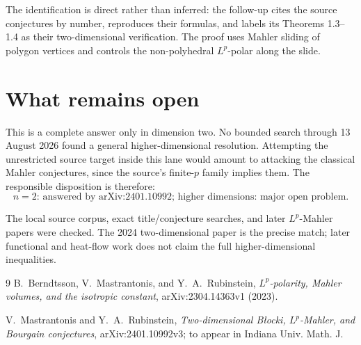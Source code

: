 \documentclass[11pt]{article}
\begin{document}
The identification is direct rather than inferred: the follow-up cites the
source conjectures by number, reproduces their formulas, and labels its
Theorems 1.3--1.4 as their two-dimensional verification.  The proof uses
Mahler sliding of polygon vertices and controls the non-polyhedral
$L^p$-polar along the slide.

\section{What remains open}

This is a complete answer only in dimension two.  No bounded search through
13 August 2026 found a general higher-dimensional resolution.  Attempting the
unrestricted source target inside this lane would amount to attacking the
classical Mahler conjectures, since the source's finite-$p$ family implies
them.  The responsible disposition is therefore:
\[
 \boxed{\text{$n=2$: answered by arXiv:2401.10992;
 higher dimensions: major open problem.}}
\]

The local source corpus, exact title/conjecture searches, and later
$L^p$-Mahler papers were checked.  The 2024 two-dimensional paper is the
precise match; later functional and heat-flow work does not claim the full
higher-dimensional inequalities.

\begin{thebibliography}{9}
B.~Berndtsson, V.~Mastrantonis, and Y.~A.~Rubinstein,
\emph{$L^p$-polarity, Mahler volumes, and the isotropic constant},
arXiv:2304.14363v1 (2023).

V.~Mastrantonis and Y.~A.~Rubinstein,
\emph{Two-dimensional B\l{}ocki, $L^p$-Mahler, and Bourgain conjectures},
arXiv:2401.10992v3; to appear in Indiana Univ. Math. J.
\end{thebibliography}
\end{document}
